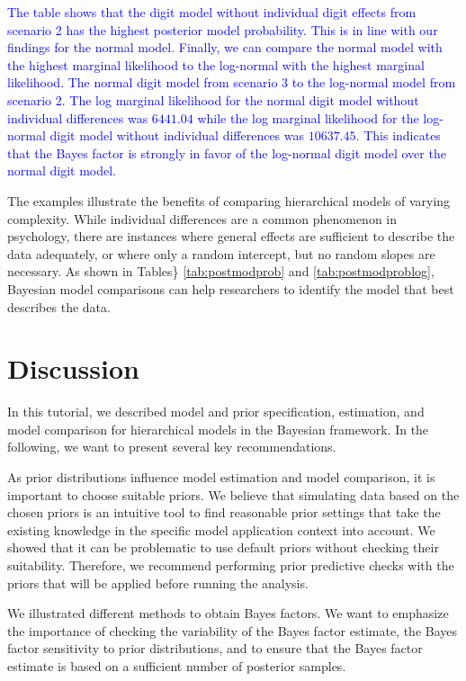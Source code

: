\documentclass[
  english,
  doc,floatsintext]{apa6}
\begin{document}
\textcolor{blue}{The table shows that the digit model without individual digit effects from scenario 2 has the highest posterior model probability. This is in line with our findings for the normal model. Finally, we can compare the normal model with the highest marginal likelihood to the log-normal with the highest marginal likelihood. The normal digit model from scenario 3 to the log-normal model from scenario 2. The log marginal likelihood for the normal digit model without individual differences was $6441.04$ while the log marginal likelihood for the log-normal digit model without individual differences was $10637.45$. This indicates that the Bayes factor is strongly in favor of the log-normal digit model over the normal digit model.}

The examples illustrate the benefits of comparing hierarchical models of varying complexity. While individual differences are a common phenomenon in psychology, there are instances where general effects are sufficient to describe the data adequately, or where only a random intercept, but no random slopes are necessary. As shown in Tables\} \ref{tab:postmodprob} and \ref{tab:postmodproblog}, Bayesian model comparisons can help researchers to identify the model that best describes the data.

\hypertarget{discussion}{%
\section{Discussion}\label{discussion}}

In this tutorial, we described model and prior specification, estimation, and model comparison for hierarchical models in the Bayesian framework. In the following, we want to present several key recommendations.

As prior distributions influence model estimation and model comparison, it is important to choose suitable priors. We believe that simulating data based on the chosen priors is an intuitive tool to find reasonable prior settings that take the existing knowledge in the specific model application context into account. We showed that it can be problematic to use default priors without checking their suitability. Therefore, we recommend performing prior predictive checks with the priors that will be applied before running the analysis.

We illustrated different methods to obtain Bayes factors. We want to emphasize the importance of checking the variability of the Bayes factor estimate, the Bayes factor sensitivity to prior distributions, and to ensure that the Bayes factor estimate is based on a sufficient number of posterior samples.
\end{document}
